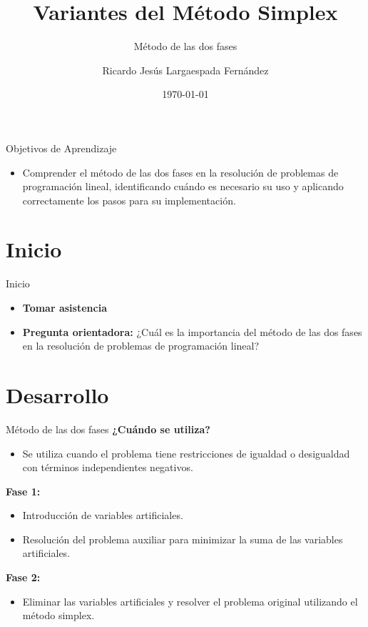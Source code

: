 \documentclass{beamer}
\title{Variantes del Método Simplex}
\subtitle{Método de las dos fases}
\author[Ricardo Largaespada]{Ricardo Jesús Largaespada Fernández}
\institute[UNI]{Ingeniería de Sistemas, DACTIC, UNI}
\date{\today}
\begin{document}
\frame{\titlepage}

\begin{frame}{Objetivos de Aprendizaje}
    \begin{itemize}
        \item Comprender el método de las dos fases en la resolución de problemas de programación lineal, identificando cuándo es necesario su uso y aplicando correctamente los pasos para su implementación.
    \end{itemize}
\end{frame}

\section{Inicio}
\begin{frame}{Inicio}
    \begin{itemize}
        \item \textbf{Tomar asistencia}
        \item \textbf{Pregunta orientadora:} ¿Cuál es la importancia del método de las dos fases en la resolución de problemas de programación lineal?
    \end{itemize}
\end{frame}

\section{Desarrollo}
\begin{frame}{Método de las dos fases}
    \textbf{¿Cuándo se utiliza?}
    \begin{itemize}
        \item Se utiliza cuando el problema tiene restricciones de igualdad o desigualdad con términos independientes negativos.
    \end{itemize}
    
    \textbf{Fase 1:}
    \begin{itemize}
        \item Introducción de variables artificiales.
        \item Resolución del problema auxiliar para minimizar la suma de las variables artificiales.
    \end{itemize}
    
    \textbf{Fase 2:}
    \begin{itemize}
        \item Eliminar las variables artificiales y resolver el problema original utilizando el método simplex.
    \end{itemize}
\end{frame}
\end{document}
